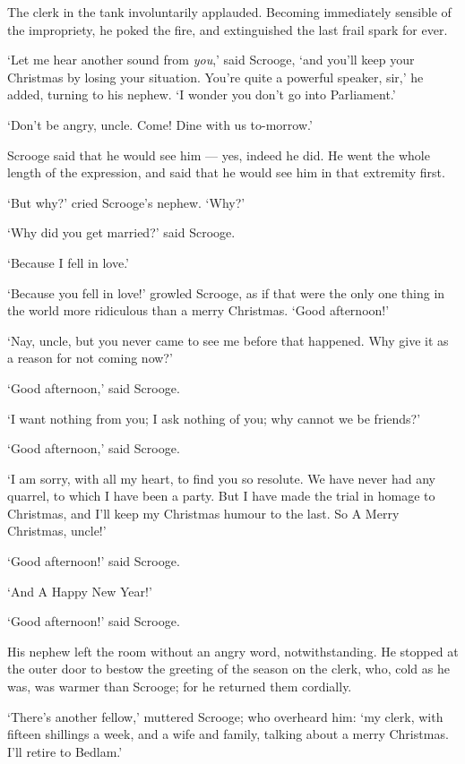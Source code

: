 \documentclass[11pt,twoside]{article}\makeatletter
\begin{document}
The clerk in the tank involuntarily applauded. Becoming immediately sensible of the impropriety, he poked the fire, and extinguished the last frail spark for ever. \par
‘Let me hear another sound from \textit{you},’ said Scrooge, ‘and you'll keep your Christmas by losing your situation. You're quite a powerful speaker, sir,’ he added, turning to his nephew. ‘I wonder you don't go into Parliament.’\par
‘Don't be angry, uncle. Come! Dine with us to-morrow.’\par
Scrooge said that he would see him — yes, indeed he did. He went the whole length of the expression, and said that he would see him in that extremity first. \par
‘But why?’ cried Scrooge's nephew. ‘Why?’\par
‘Why did you get married?’ said Scrooge.\par
‘Because I fell in love.’\par
‘Because you fell in love!’ growled Scrooge, as if that were the only one thing in the world more ridiculous than a merry Christmas. ‘Good afternoon!’\par
‘Nay, uncle, but you never came to see me before that happened. Why give it as a reason for not coming now?’\par
‘Good afternoon,’ said Scrooge.\par
‘I want nothing from you; I ask nothing of you; why cannot we be friends?’\par
‘Good afternoon,’ said Scrooge.\par
‘I am sorry, with all my heart, to find you so resolute. We have never had any quarrel, to which I have been a party. But I have made the trial in homage to Christmas, and I'll keep my Christmas humour to the last. So A Merry Christmas, uncle!’\par
‘Good afternoon!’ said Scrooge.\par
‘And A Happy New Year!’\par
‘Good afternoon!’ said Scrooge.\par
His nephew left the room without an angry word, notwithstanding. He stopped at the outer door to bestow the greeting of the season on the clerk, who, cold as he was, was warmer than Scrooge; for he returned them cordially. \par
‘There's another fellow,’ muttered Scrooge; who overheard him: ‘my clerk, with fifteen shillings a week, and a wife and family, talking about a merry Christmas. I'll retire to Bedlam.’\par
\end{document}
